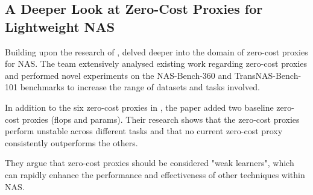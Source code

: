 \subsection{A Deeper Look at Zero-Cost Proxies for Lightweight NAS}

Building upon the research of \cite{abdelfattah2021zero}, \cite{colin2022adeeperlook} delved deeper into the domain of zero-cost proxies for NAS. The team extensively analysed existing work regarding zero-cost proxies and performed novel experiments on the NAS-Bench-360 \autocite{tu2021bench} and TransNAS-Bench-101 \autocite{duan2021transnas} benchmarks to increase the range of datasets and tasks involved.

In addition to the six zero-cost proxies in \cite{abdelfattah2021zero}, the paper added two baseline zero-cost proxies (flops and params). Their research shows that the zero-cost proxies perform unstable across different tasks and that no current zero-cost proxy consistently outperforms the others. 

They argue that zero-cost proxies should be considered "weak learners", which can rapidly enhance the performance and effectiveness of other techniques within NAS. 

